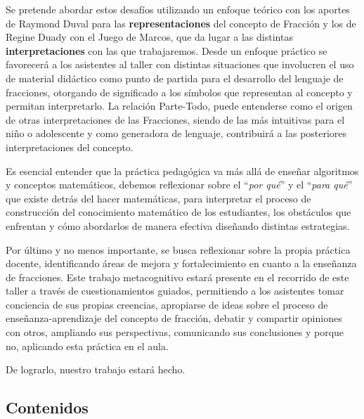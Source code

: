 Se pretende abordar estos desafíos utilizando un enfoque teórico con los aportes de Raymond Duval para las \textbf{representaciones} del concepto de Fracción y los de Regine Duady con el Juego de Marcos, que da lugar a las distintas \textbf{interpretaciones} con las que trabajaremos. Desde un enfoque práctico se favorecerá a los asistentes al taller con distintas situaciones que involucren el uso de material didáctico como punto de partida para el desarrollo del lenguaje de fracciones, otorgando de significado a los símbolos que representan al concepto y permitan interpretarlo. La relación Parte-Todo, puede entenderse como el origen de otras interpretaciones de las Fracciones, siendo de las más intuitivas para el niño o adolescente y como generadora de lenguaje, contribuirá a las posteriores interpretaciones del concepto.

Es esencial entender que la práctica pedagógica va más allá de enseñar algoritmos y conceptos matemáticos, debemos reflexionar sobre el ``\textit{por qué}'' y el ``\textit{para qué}'' que existe detrás del hacer matemáticas, para interpretar el proceso de construcción del conocimiento matemático de los estudiantes, los obstáculos que enfrentan y cómo abordarlos de manera efectiva diseñando distintas estrategias.

Por último y no menos importante, se busca reflexionar sobre la propia práctica docente, identificando áreas de mejora y fortalecimiento en cuanto a la enseñanza de fracciones. Este trabajo metacognitivo estará presente en el recorrido de este taller a través de cuestionamientos guiados, permitiendo a los asistentes tomar conciencia de sus propias creencias, apropiarse de ideas sobre el proceso de enseñanza-aprendizaje del concepto de fracción, debatir y compartir opiniones con otros, ampliando sus perspectivas, comunicando sus conclusiones y porque no, aplicando esta práctica en el aula.

De lograrlo, nuestro trabajo estará hecho.

\subsection{Contenidos}

